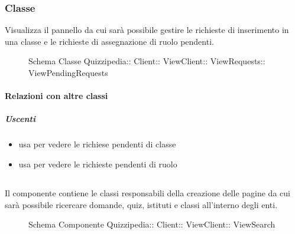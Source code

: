\subsubsection{Classe }
Visualizza il pannello da cui sarà possibile gestire le richieste di inserimento in una classe e le richieste di assegnazione di ruolo pendenti.
\begin{figure}[H]
\centering
\noindent{}
\caption[Schema Classe ViewPendingRequests]{Schema Classe Quizzipedia:: Client:: ViewClient:: ViewRequests:: ViewPendingRequests}
\end{figure}
\paragraph{Relazioni con altre classi}
\subparagraph{Uscenti}
\begin{itemize}
\item usa  per vedere le richiese pendenti di classe
\item usa  per vedere le richieste pendenti di ruolo
\end{itemize}
\subsection{}
Il componente contiene le classi responsabili della creazione delle pagine da cui sarà possibile ricercare domande, quiz, istituti e classi all'interno degli enti.
\begin{figure}[H]
\centering
\noindent{}
\caption[Schema Componente ViewSearch]{Schema Componente Quizzipedia:: Client:: ViewClient:: ViewSearch}
\end{figure}
